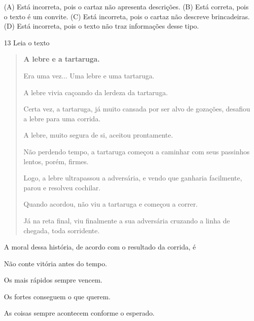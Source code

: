 
(A) Está incorreta, pois o cartaz não apresenta descrições.
(B) Está correta, pois o texto é um convite.
(C) Está incorreta, pois o cartaz não descreve brincadeiras.
(D) Está incorreta, pois o texto não traz informações desse tipo.

\num{13} Leia o texto

\begin{quote}
\textbf{A lebre e a tartaruga.}

Era uma vez... Uma lebre e uma tartaruga.

A lebre vivia caçoando da lerdeza da tartaruga.

Certa vez, a tartaruga, já muito cansada por ser alvo de gozações,
desafiou a lebre para uma corrida.

A lebre, muito segura de si, aceitou prontamente.

Não perdendo tempo, a tartaruga começou a caminhar com seus passinhos
lentos, porém, firmes.

Logo, a lebre ultrapassou a adversária, e vendo que ganharia facilmente, parou
e resolveu cochilar.

Quando acordou, não viu a tartaruga e começou a correr.

Já na reta final, viu finalmente a sua adversária cruzando a linha de
chegada, toda sorridente.
\end{quote}


A moral dessa história, de acordo com o resultado da corrida, é

\begin{escolha}
\item Não conte vitória antes do tempo.

\item Os mais rápidos sempre vencem.

\item Os fortes conseguem o que querem.

\item As coisas sempre acontecem conforme o esperado.
\end{escolha}

